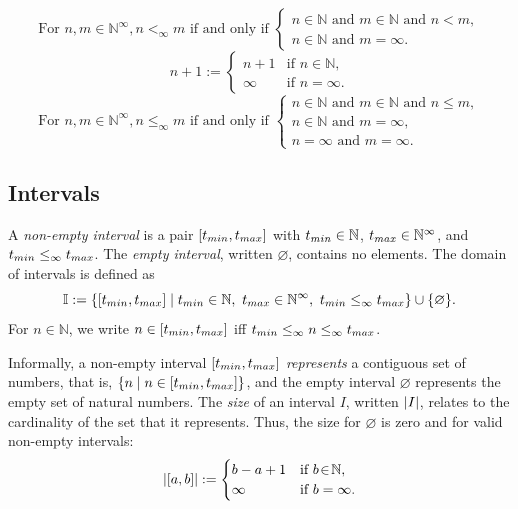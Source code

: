             \[
           \text{For } n,m \in \mathbb{N}^\infty, n <_\infty m \text{ if and only if }
            \begin{cases}
                n \in \mathbb{N} \text{ and } m \in \mathbb{N} \text{ and } n < m,\\
                n \in \mathbb{N} \text{ and } m = \infty.
            \end{cases}
	            \]
\[
n + 1 :=
\begin{cases}
n+1 & \text{if } n \in \mathbb{N},\\
\infty & \text{if } n = \infty.
\end{cases}
\]
            \[
             \text{For } n,m \in \mathbb{N}^\infty,n \leq_\infty m \text{ if and only if }
            \begin{cases}
                n \in \mathbb{N} \text{ and } m \in \mathbb{N} \text{ and } n \leq m,\\
                n \in \mathbb{N} \text{ and } m = \infty,\\
                n = \infty \text{ and } m = \infty.
            \end{cases}
            \]
\subsection{Intervals}


\begin{definition}[Interval]
A \emph{non-empty interval} is a pair $[t_{min},t_{max}]$ with $t_{min} \in \mathbb{N}$, $t_{max} \in \mathbb{N}^\infty$, and $t_{min} \leq_\infty t_{max}$. The \emph{empty interval}, written $\varnothing$, contains no elements.
The domain of intervals is defined as $$
\mathbb{I} := \{[t_{min},t_{max}] \mid t_{min} \in \mathbb{N},\ t_{max} \in \mathbb{N}^\infty,\ t_{min} \leq_\infty t_{max}\} \cup \{\varnothing\}.
$$
For $n\in\mathbb{N}$, we write $n\in[t_{min},t_{max}]$ iff $t_{min} \leq_\infty n \leq_\infty t_{max}$.
 \end{definition}

 Informally, a non-empty interval $[t_{min},t_{max}]$  \emph{represents} a contiguous set of numbers, that is,  $\{n \mid n\in[t_{min},t_{max}]\}$, and the empty interval $\varnothing$ represents the empty set of natural numbers.
The \emph{size} of an interval $I$, written $\vert I\vert$, relates to the cardinality of the set that it represents. Thus, the size for $\varnothing$ is zero and for valid non-empty intervals:
\[
\vert [a,b]\vert :=
\begin{cases}
b-a+1 & \text{if } b\!\in\!\mathbb{N},\\
\infty & \text{if } b=\infty.
\end{cases}
\]

